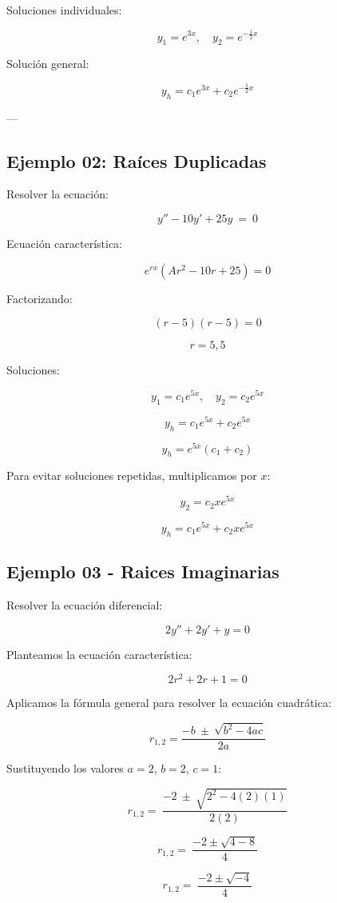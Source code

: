 Soluciones individuales:

\[
y_{1} = e^{3x}, \quad y_{2} = e^{- \frac{1}{2} x}
\]

Solución general:

\[
y_{h} = c_{1} e^{3x} + c_{2} e^{- \frac{1}{2} x}
\]

---

\subsection{Ejemplo 02: Raíces Duplicadas}

Resolver la ecuación:

\[
y''-10y'+25y\ =\ 0
\]

Ecuación característica:

\[
e^{rx}( Ar^{2} -10r+25) =0
\]

Factorizando:

\[
( r-5)( r-5) = 0
\]

\[
r = 5, 5
\]

Soluciones:

\[
y_{1} = c_{1} e^{5x}, \quad y_{2} = c_{2} e^{5x}
\]

\[
y_{h} = c_{1} e^{5x} + c_{2} e^{5x}
\]

\[
y_{h} = e^{5x}( c_{1} + c_{2})
\]

Para evitar soluciones repetidas, multiplicamos por \( x \):

\[
y_{2} = c_{2} x e^{5x}
\]

\[
y_{h} = c_{1} e^{5x} + c_{2} x e^{5x}
\]
\subsection{Ejemplo 03 - Raices Imaginarias}

Resolver la ecuación diferencial:

\[
2y''+2y'+y=0
\]

Planteamos la ecuación característica:

\[
2r^{2} +2r+1=0
\]

Aplicamos la fórmula general para resolver la ecuación cuadrática:

\[
r_{1,2} =\frac{-b\ \pm \ \sqrt{b^{2} -4ac}}{2a}
\]

Sustituyendo los valores \( a = 2 \), \( b = 2 \), \( c = 1 \):

\[
r_{1,2} =\ \frac{-2\ \pm \ \sqrt{2^{2} -4(2)(1)}}{2(2)}
\]

\[
r_{1,2} =\ \frac{-2\pm \sqrt{4-8}}{4}
\]

\[
r_{1,2} =\ \frac{-2\pm \sqrt{-4}}{4}
\]

